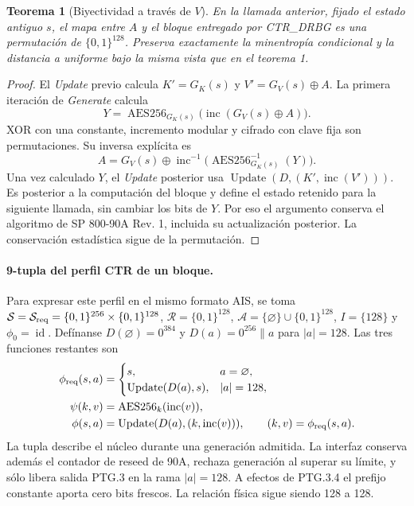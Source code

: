 \documentclass[11pt,a4paper]{article}
\newtheorem{theorem}{Teorema}
\newcommand{\bits}{\{0,1\}}
\newcommand{\AES}{\operatorname{AES256}}
\newcommand{\inc}{\operatorname{inc}}
\begin{document}
\begin{theorem}[Biyectividad a través de $V$]
En la llamada anterior, fijado el estado antiguo $s$,
el mapa entre $A$ y el bloque entregado por CTR\_DRBG es una
permutación de $\bits^{128}$. Preserva exactamente la minentropía
condicional y la distancia a uniforme bajo la misma vista que
en el teorema 1.
\end{theorem}
\begin{proof}
El \emph{Update} previo calcula
$K'=G_K(s)$ y $V'=G_V(s)\oplus A$. La primera
iteración de \emph{Generate} calcula
\[
 Y=\AES_{G_K(s)}\big(\inc(G_V(s)\oplus A)\big).
\]
XOR con una constante, incremento modular y cifrado con clave
fija son permutaciones. Su inversa explícita es
\[
 A=G_V(s)\oplus
       \inc^{-1}\big(\AES^{-1}_{G_K(s)}(Y)\big).
\]
Una vez calculado $Y$, el \emph{Update} posterior usa
$\operatorname{Update}(D,(K',\inc(V')))$. Es posterior a la
computación del bloque y define el estado retenido para la
siguiente llamada, sin cambiar los bits de $Y$. Por eso el
argumento conserva el algoritmo de SP 800-90A Rev. 1,
incluida su actualización posterior. La conservación
estadística sigue de la permutación.
\end{proof}

\paragraph{9-tupla del perfil CTR de un bloque.}
Para expresar este perfil en el mismo formato AIS, se toma
$\mathcal S=\mathcal S_{\rm req}=\bits^{256}\times\bits^{128}$,
$\mathcal R=\bits^{128}$, $\mathcal A=\{\varnothing\}\cup\bits^{128}$,
$I=\{128\}$ y $\phi_0=\operatorname{id}$. Defínanse
$D(\varnothing)=0^{384}$ y $D(a)=0^{256}\|a$ para $|a|=128$.
Las tres funciones restantes son
\begin{align*}
\phi_{\rm req}(s,a)&=
\begin{cases}
s,&a=\varnothing,\\
\operatorname{Update}(D(a),s),&|a|=128,
\end{cases}\\
\psi(k,v)&=\AES_k(\inc(v)),\\
\phi(s,a)&=\operatorname{Update}(D(a),(k,\inc(v))),
\qquad (k,v)=\phi_{\rm req}(s,a).
\end{align*}
La tupla describe el núcleo durante una generación admitida.
La interfaz conserva además el contador de reseed de 90A, rechaza
generación al superar su límite, y sólo libera salida PTG.3 en
la rama $|a|=128$. A efectos de PTG.3.4 el prefijo constante
aporta cero bits frescos. La relación física sigue siendo 128 a 128.
\end{document}
